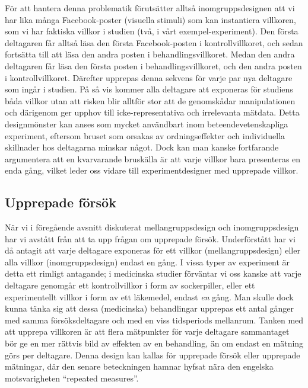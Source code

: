\documentclass[
]{book}
\begin{document}
För att hantera denna problematik förutsätter alltså inomgruppsdesignen att vi har lika många Facebook-poster (visuella stimuli) som kan instantiera villkoren, som vi har faktiska villkor i studien (två, i vårt exempel-experiment). Den första deltagaren får alltså läsa den första Facebook-posten i kontrollvillkoret, och sedan fortsätta till att läsa den andra posten i behandlingsvillkoret. Medan den andra deltagaren får läsa den första posten i behandlingsvillkoret, och den andra posten i kontrollvillkoret. Därefter upprepas denna sekvens för varje par nya deltagare som ingår i studien. På så vis kommer alla deltagare att exponeras för studiens båda villkor utan att risken blir alltför stor att de genomskådar manipulationen och därigenom ger upphov till icke-representativa och irrelevanta mätdata. Detta designmönster kan anses som mycket användbart inom beteendevetenskapliga experiment, eftersom bruset som orsakas av ordningseffekter och individuella skillnader hos deltagarna minskar något. Dock kan man kanske fortfarande argumentera att en kvarvarande bruskälla är att varje villkor bara presenteras en enda gång, vilket leder oss vidare till experimentdesigner med upprepade villkor.

\hypertarget{sub07.5.5}{%
\subsection{Upprepade försök}\label{sub07.5.5}}

När vi i föregående avsnitt diskuterat mellangruppsdesign och inomgruppsdesign har vi avstått från att ta upp frågan om upprepade försök. Underförstått har vi då antagit att varje deltagare exponeras för ett villkor (mellangruppsdesign) eller alla villkor (inomgruppsdesign) endast en gång. I vissa typer av experiment är detta ett rimligt antagande; i medicinska studier förväntar vi oss kanske att varje deltagare genomgår ett kontrollvillkor i form av sockerpiller, eller ett experimentellt villkor i form av ett läkemedel, endast \emph{en} gång. Man skulle dock kunna tänka sig att dessa (medicinska) behandlingar upprepas ett antal gånger med samma försöksdeltagare och med en viss tidsperiods mellanrum. Tanken med att upprepa villkoren är att flera mätpunkter för varje deltagare sammantaget bör ge en mer rättvis bild av effekten av en behandling, än om endast en mätning görs per deltagare. Denna design kan kallas för upprepade försök eller upprepade mätningar, där den senare beteckningen hamnar hyfsat nära den engelska motsvarigheten ``repeated measures''.
\end{document}
